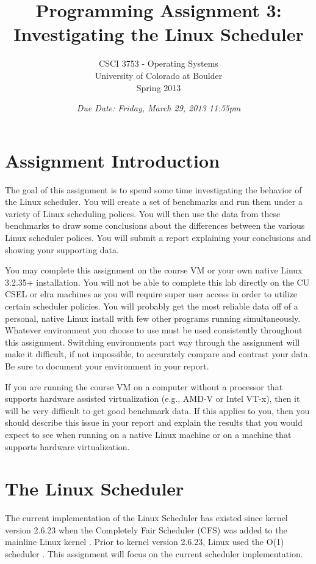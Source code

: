 \documentclass[12pt]{article}
\title{Programming Assignment 3:\\Investigating the Linux Scheduler}
\author{
  CSCI 3753 - Operating Systems\\
  University of Colorado at Boulder\\
  Spring 2013\\
}
\date{\emph{Due Date: Friday, March 29, 2013 11:55pm}}
\begin{document}
\maketitle

\section{Assignment Introduction}

The goal of this assignment is to spend some time investigating the
behavior of the Linux scheduler. You will create a set of benchmarks
and run them under a variety of Linux scheduling polices. You will
then use the data from these benchmarks to draw some conclusions about
the differences between the various Linux scheduler polices. You will
submit a report explaining your conclusions and showing your
supporting data.

You may complete this assignment on the course VM or your own native
Linux 3.2.35+ installation. You will not be able to complete this lab
directly on the CU CSEL or elra machines as you will require super
user access in order to utilize certain scheduler policies.
You will probably get the most reliable data off of a personal, native
Linux install with few other programs running simultaneously. Whatever
environment you choose to use must be used consistently throughout this
assignment. Switching environments part way through the assignment
will make it difficult, if not impossible, to accurately compare and
contrast your data. Be sure to document your environment in your
report.

If you are running the course VM on a computer without a processor that supports
hardware assisted virtualization (e.g., AMD-V or Intel VT-x), then it will
be very difficult to get good benchmark data.  If this applies to you, then you
should describe this issue in your report and explain the results that you would
expect to see when running on a native Linux machine or on a machine that
supports hardware virtualization.

\section{The Linux Scheduler}

The current implementation of the Linux
Scheduler has existed since kernel version 2.6.23 when the Completely
Fair Scheduler (CFS) was added to the mainline Linux kernel
\cite{Molnar-CFS,Jones-InsideCFS,Kumar-MultiCFS}. Prior to kernel
version 2.6.23, Linux used the O(1) scheduler \cite{Le-StudyLKS}.
This assignment will focus on the current scheduler implementation.
\end{document}
